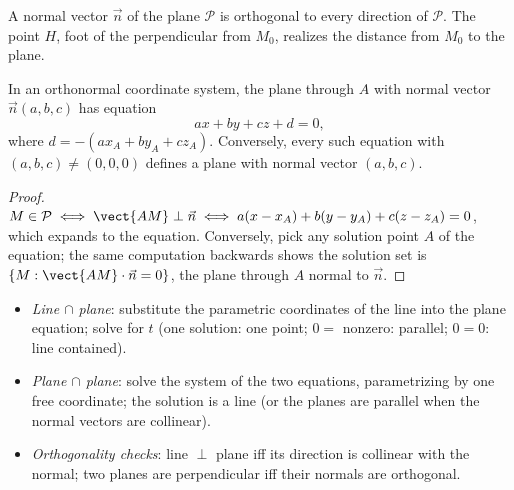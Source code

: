 \begin{omfigure}

{\small A normal vector $\vec n$ of the plane $\mathcal P$ is orthogonal
to every direction of $\mathcal P$. The point $H$, foot of the
perpendicular from $M_0$, realizes the distance from $M_0$ to the plane.}
\end{omfigure}

\begin{theorem}\label{thm:tle:space:planeeq}
In an orthonormal coordinate system, the plane through
$A$ with normal vector $\vec n(a, b, c)$ has equation
\[
a x + b y + c z + d = 0,
\]
where $d = -(ax_A + by_A + cz_A)$. Conversely, every such equation with
$(a,b,c) \neq (0,0,0)$ defines a plane with normal vector $(a, b, c)$.
\end{theorem}

\begin{proof}
$M \in \mathcal P \iff \vect{AM} \perp \vec n \iff
a(x - x_A) + b(y - y_A) + c(z - z_A) = 0$, which expands to the equation.
Conversely, pick any solution point $A$ of the equation; the same
computation backwards shows the solution set is
$\{M : \vect{AM}\cdot\vec n = 0\}$, the plane through $A$ normal to
$\vec n$.
\end{proof}

\begin{method}\label{met:tle:space:intersections}
\begin{itemize}
  \item \emph{Line $\cap$ plane}: substitute the parametric coordinates of
        the line into the plane equation; solve for $t$ (one solution: one
        point; $0 = $ nonzero: parallel; $0 = 0$: line contained).
  \item \emph{Plane $\cap$ plane}: solve the system of the two equations,
        parametrizing by one free coordinate; the solution is a line (or the
        planes are parallel when the normal vectors are collinear).
  \item \emph{Orthogonality checks}: line $\perp$ plane iff its direction
        is collinear with the normal; two planes are perpendicular iff their
        normals are orthogonal.
\end{itemize}
\end{method}

